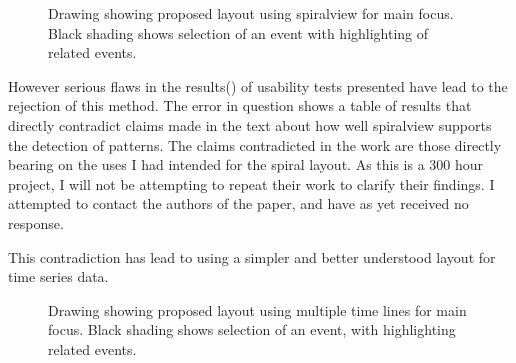 \begin{figure}[tbh]
\caption{\protect\label{spiral_plan}Drawing showing proposed layout using spiralview for main focus. Black shading shows selection of an event with highlighting of related events.}
\end{figure}
 
However serious flaws in the results(\cite{chin2009visual}) of usability tests presented have lead to the rejection of this method. The error in question shows a table of results that directly contradict claims made in the text about how well spiralview supports the detection of patterns. The claims contradicted in the work are those directly bearing on the uses I had intended for the spiral layout. As this is a 300 hour project, I will not be attempting to repeat their work to clarify their findings. I attempted to contact the authors of the paper, and have as yet received no response.

This contradiction has lead to using a simpler and better understood layout for time series data. 

\begin{figure}[tbh]
\caption{\protect\label{lines}Drawing showing proposed layout using multiple time lines for main focus. Black shading shows selection of an event, with highlighting related events.}
\end{figure}


